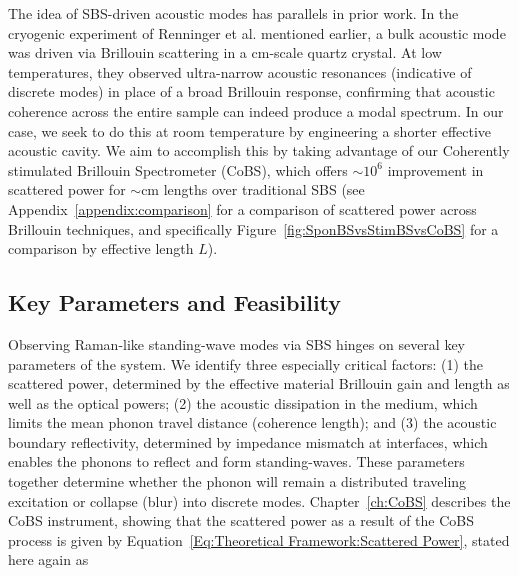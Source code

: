 The idea of \ac{SBS}-driven acoustic modes has parallels in prior work. In the cryogenic experiment of Renninger et al. mentioned earlier, \cite{renninger2018bulk} a bulk acoustic mode was driven via Brillouin scattering in a \si{\centi\meter}-scale quartz crystal. At low temperatures, they observed ultra-narrow acoustic resonances (indicative of discrete modes) in place of a broad Brillouin response, confirming that acoustic coherence across the entire sample can indeed produce a modal spectrum. In our case, we seek to do this at room temperature by engineering a shorter effective acoustic cavity. We aim to accomplish this by taking advantage of our Coherently stimulated Brillouin Spectrometer (\ac{CoBS}), which offers \(\sim\)\(10^{6}\) improvement in scattered power for \(\sim\)\si{\centi\meter} lengths over traditional \ac{SBS} (see Appendix~\ref{appendix:comparison} for a comparison of scattered power across Brillouin techniques, and specifically Figure~\ref{fig:SponBSvsStimBSvsCoBS} for a comparison by effective length \(L\)).

\subsection{Key Parameters and Feasibility}
\label{subsec:Raman:KeyParametersandFeasibility}

Observing Raman-like standing-wave modes via \ac{SBS} hinges on several key parameters of the system. We identify three especially critical factors: (1) the scattered power, determined by the effective material Brillouin gain and length as well as the optical powers; (2) the acoustic dissipation in the medium, which limits the mean phonon travel distance (coherence length); and (3) the acoustic boundary reflectivity, determined by impedance mismatch at interfaces, which enables the phonons to reflect and form standing-waves. These parameters together determine whether the phonon will remain a distributed traveling excitation or collapse (blur) into discrete modes. Chapter~\ref{ch:CoBS} describes the \ac{CoBS} instrument, showing that the scattered power as a result of the \ac{CoBS} process is given by Equation~\ref{Eq:Theoretical Framework:Scattered Power}, stated here again as

